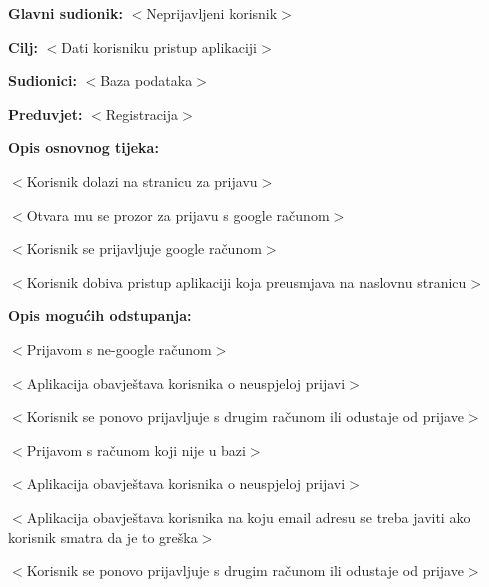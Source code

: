 					\noindent {}
					\begin{packed_item}
	
						\item \textbf{Glavni sudionik:} $<$Neprijavljeni korisnik$>$
						\item \textbf{Cilj:} $<$Dati korisniku pristup aplikaciji$>$
						\item \textbf{Sudionici:} $<$Baza podataka$>$
						\item \textbf{Preduvjet:} $<$Registracija$>$
						\item \textbf{Opis osnovnog tijeka:}
						
						\item[] \begin{packed_enum}
	
							\item $<$Korisnik dolazi na stranicu za prijavu$>$
							\item $<$Otvara mu se prozor za prijavu s google računom$>$
							\item $<$Korisnik se prijavljuje google računom$>$
							\item $<$Korisnik dobiva pristup aplikaciji koja preusmjava na naslovnu stranicu$>$
						\end{packed_enum}
						
						\item \textbf{Opis mogućih odstupanja:}

						\item[] \begin{packed_item}

							\item[2.a] $<$Prijavom s ne-google računom$>$
							\item[] \begin{packed_enum}

								\item $<$Aplikacija obavještava korisnika o neuspjeloj prijavi$>$
								\item $<$Korisnik se ponovo prijavljuje s drugim računom ili odustaje od prijave$>$

							\end{packed_enum}

							\item[2.b] $<$Prijavom s računom koji nije u bazi$>$
							\item[] \begin{packed_enum}

								\item $<$Aplikacija obavještava korisnika o neuspjeloj prijavi$>$
								\item $<$Aplikacija obavještava korisnika na koju email adresu se treba javiti ako korisnik smatra da je to greška$>$
								\item $<$Korisnik se ponovo prijavljuje s drugim računom ili odustaje od prijave$>$

							\end{packed_enum}

						\end{packed_item}
					\end{packed_item}

